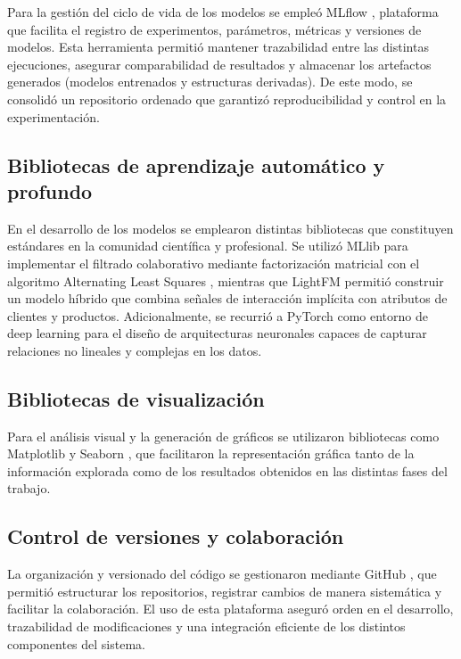 Para la gestión del ciclo de vida de los modelos se empleó MLflow \cite{ARTICLE:MLflow2018}, plataforma que facilita el registro de experimentos, parámetros, métricas y versiones de modelos. Esta herramienta permitió mantener trazabilidad entre las distintas ejecuciones, asegurar comparabilidad de resultados y almacenar los artefactos generados (modelos entrenados y estructuras derivadas). De este modo, se consolidó un repositorio ordenado que garantizó reproducibilidad y control en la experimentación.

\subsection{Bibliotecas de aprendizaje automático y profundo}

En el desarrollo de los modelos se emplearon distintas bibliotecas que constituyen estándares en la comunidad científica y profesional. Se utilizó MLlib para implementar el filtrado colaborativo mediante factorización matricial con el algoritmo Alternating Least Squares \cite{ARTICLE:ALS2008}, mientras que LightFM \cite{ARTICLE:LightFM2015} permitió construir un modelo híbrido que combina señales de interacción implícita con atributos de clientes y productos. Adicionalmente, se recurrió a PyTorch como entorno de deep learning para el diseño de arquitecturas neuronales capaces de capturar relaciones no lineales y complejas en los datos. 

\subsection{Bibliotecas de visualización}

Para el análisis visual y la generación de gráficos se utilizaron bibliotecas como Matplotlib \cite{ARTICLE:Matplotlib2007} y Seaborn \cite{ARTICLE:Seaborn2021}, que facilitaron la representación gráfica tanto de la información explorada como de los resultados obtenidos en las distintas fases del trabajo.

\subsection{Control de versiones y colaboración}

La organización y versionado del código se gestionaron mediante GitHub \cite{ARTICLE:GitHub}, que permitió estructurar los repositorios, registrar cambios de manera sistemática y facilitar la colaboración. El uso de esta plataforma aseguró orden en el desarrollo, trazabilidad de modificaciones y una integración eficiente de los distintos componentes del sistema.

